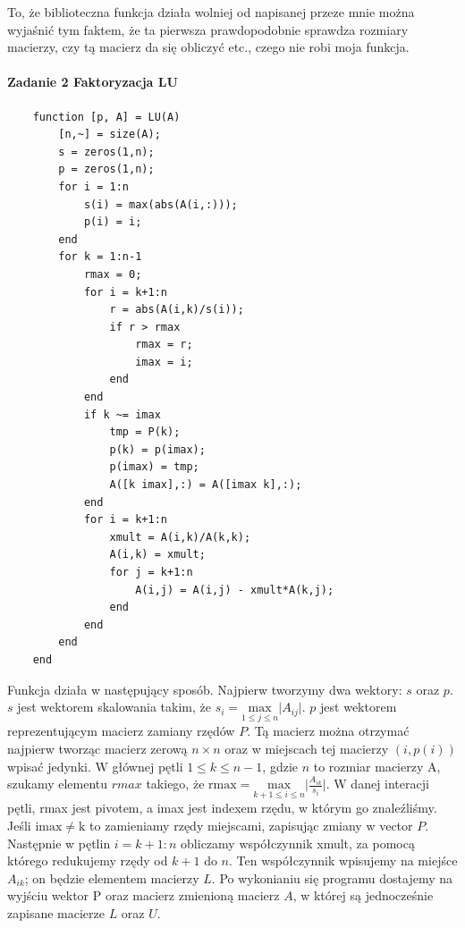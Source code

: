 \documentclass[12pt,a4paper]{article}
\begin{document}
To, że biblioteczna funkcja działa wolniej od napisanej przeze mnie można
wyjaśnić tym faktem, że ta pierwsza prawdopodobnie sprawdza rozmiary macierzy,
czy tą macierz da się obliczyć etc., czego nie robi moja funkcja.
  \paragraph{Zadanie 2 Faktoryzacja LU}%
  \begin{Verbatim}
    function [p, A] = LU(A)
        [n,~] = size(A);
        s = zeros(1,n);
        p = zeros(1,n);
        for i = 1:n
            s(i) = max(abs(A(i,:)));
            p(i) = i;
        end
        for k = 1:n-1
            rmax = 0;
            for i = k+1:n
                r = abs(A(i,k)/s(i));
                if r > rmax
                    rmax = r;
                    imax = i;
                end
            end
            if k ~= imax
                tmp = P(k);
                p(k) = p(imax);
                p(imax) = tmp;
                A([k imax],:) = A([imax k],:);
            end
            for i = k+1:n
                xmult = A(i,k)/A(k,k);
                A(i,k) = xmult;
                for j = k+1:n
                    A(i,j) = A(i,j) - xmult*A(k,j);
                end
            end
        end
    end
  \end{Verbatim}
  Funkcja działa w następujący sposób. Najpierw tworzymy dwa wektory: $s$ oraz $p$.
  $s$ jest wektorem skalowania takim, że
  $s_i = \underset{1 \leq j \leq n}{\mathrm{max}}\lvert A_{ij} \rvert$.
  $p$ jest wektorem reprezentującym macierz zamiany rzędów $P$. Tą macierz można otrzymać
  najpierw tworząc macierz zerową $n \times n$ oraz w miejscach tej macierzy $(i,p(i))$
  wpisać jedynki. W głównej pętli $1 \leq k \leq n-1$, gdzie $n$ to rozmiar macierzy A,
  szukamy elementu $rmax$ takiego, że
  $\mathrm{rmax} = \underset{k+1 \leq i \leq n}{\mathrm{max}} \lvert \frac{A_{ik}}{s_i} \rvert$.
  W danej interacji pętli, rmax jest pivotem, a imax jest indexem rzędu, w
  którym go znaleźliśmy. Jeśli $\mathrm{imax} \neq \mathrm{k}$ to zamieniamy
  rzędy miejscami, zapisując zmiany w vector $P$. Następnie w pętlin $i = k+1:n$ obliczamy
  współczynnik xmult, za pomocą którego redukujemy rzędy od $k+1$ do $n$. Ten współczynnik
  wpisujemy na miejśce $A_{ik}$; on będzie elementem macierzy $L$. Po wykonianiu się
  programu dostajemy na wyjściu wektor P oraz macierz zmienioną macierz $A$, w
  której są jednocześnie zapisane macierze $L$ oraz $U$. \newline
\end{document}
